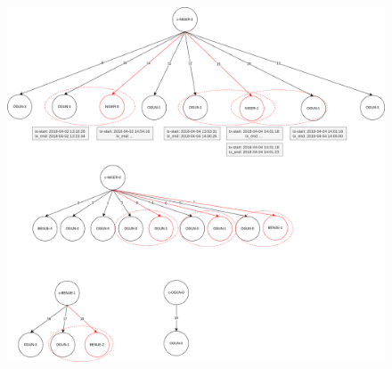 \begin{graysection}
\begin{figure}[H]
  \hspace*{-2cm} 
  \includegraphics[scale=0.45]{images/2-QueryModel/FP1-test-1.1.png}
\end{figure}

\end{graysection}